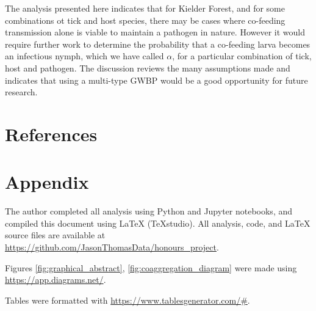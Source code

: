 \documentclass{article}
\begin{document}
The analysis presented here indicates that for Kielder Forest, and for some combinations ot tick and host species, there may be cases where co-feeding transmission alone is viable to maintain a pathogen in nature. However it would require further work to determine the probability that a co-feeding larva becomes an infectious nymph, which we have called $ \alpha $, for a particular combination of tick, host and pathogen. The discussion reviews the many assumptions made and indicates that using a multi-type GWBP would be a good opportunity for future research.

\newpage

\section{References}
\printbibliography[heading=none]

\newpage

\section{Appendix}

The author completed all analysis using Python and Jupyter notebooks, and compiled this document using LaTeX (TeXstudio). All analysis, code, and LaTeX source files are available at \url{https://github.com/JasonThomasData/honours_project}.

Figures \ref{fig:graphical_abstract}, \ref{fig:coaggregation_diagram} were made using \url{https://app.diagrams.net/}.

Tables were formatted with \url{https://www.tablesgenerator.com/#}.
\end{document}
